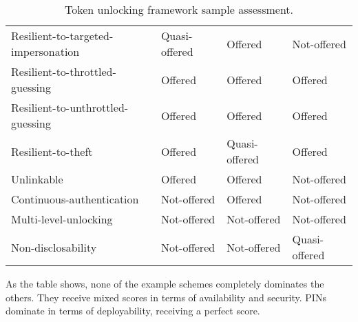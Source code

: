 \begin{table}
\begin{tabular}{l|l|l|l}
    Resilient-to-targeted-impersonation & \cellcolor{yellow!25}Quasi-offered & \cellcolor{green!25}Offered       & \cellcolor{red!25}Not-offered      \\
    Resilient-to-throttled-guessing     & \cellcolor{green!25}Offered       & \cellcolor{green!25}Offered       & \cellcolor{green!25}Offered          \\
    Resilient-to-unthrottled-guessing   & \cellcolor{green!25}Offered       & \cellcolor{green!25}Offered       & \cellcolor{green!25}Offered          \\
    Resilient-to-theft                  & \cellcolor{green!25}Offered       & \cellcolor{yellow!25}Quasi-offered   & \cellcolor{green!25}Offered          \\
    Unlinkable                          & \cellcolor{green!25}Offered       & \cellcolor{green!25}Offered       & \cellcolor{red!25}Not-offered      \\
    Continuous-authentication           & \cellcolor{red!25}Not-offered   & \cellcolor{green!25}Offered       & \cellcolor{red!25}Not-offered      \\
    Multi-level-unlocking               & \cellcolor{red!25}Not-offered   & \cellcolor{red!25}Not-offered   & \cellcolor{red!25}Not-offered      \\
    Non-disclosability                  & \cellcolor{red!25}Not-offered   & \cellcolor{red!25}Not-offered   & \cellcolor{yellow!25}Quasi-offered    \\
    \end{tabular}

	\caption{Token unlocking framework sample assessment.}
	\label{table:results}

\end{table}

As the table shows, none of the example schemes completely dominates the others. They receive mixed scores in terms of availability and security. PINs dominate in terms of deployability, receiving a perfect score. 